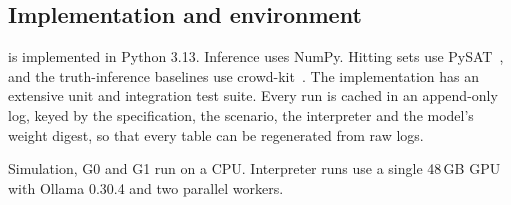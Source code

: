 \subsection{Implementation and environment}

\specdx is implemented in Python 3.13. Inference uses NumPy. Hitting sets use PySAT~\cite{ignatiev2018pysat}, and the truth-inference baselines use crowd-kit~\cite{ustalov2024learning}. The implementation has an extensive unit and integration test suite. Every run is cached in an append-only log, keyed by the specification, the scenario, the interpreter and the model's weight digest, so that every table can be regenerated from raw logs.

Simulation, G0 and G1 run on a CPU. Interpreter runs use a single 48\,GB GPU with Ollama 0.30.4 and two parallel workers.

